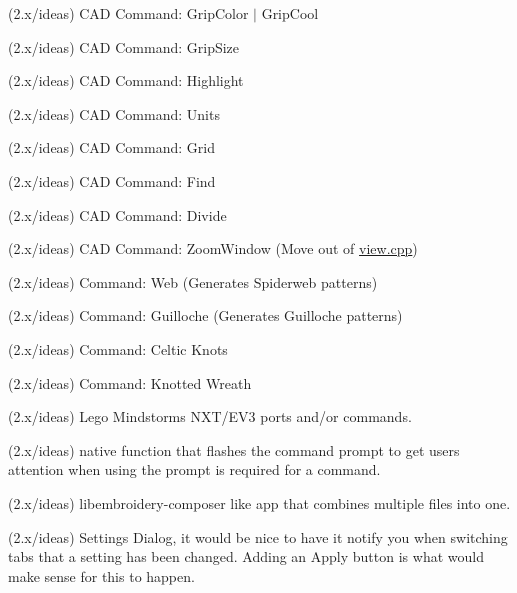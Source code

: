 \begin{DoxyRefList}
\label{todo__todo000089}%
%
(2.\+x/ideas) CAD Command\+: Grip\+Color $|$ Grip\+Cool

\label{todo__todo000090}%
%
(2.\+x/ideas) CAD Command\+: Grip\+Size

\label{todo__todo000091}%
%
(2.\+x/ideas) CAD Command\+: Highlight

\label{todo__todo000092}%
%
(2.\+x/ideas) CAD Command\+: Units

\label{todo__todo000093}%
%
(2.\+x/ideas) CAD Command\+: Grid

\label{todo__todo000094}%
%
(2.\+x/ideas) CAD Command\+: Find

\label{todo__todo000095}%
%
(2.\+x/ideas) CAD Command\+: Divide

\label{todo__todo000096}%
%
(2.\+x/ideas) CAD Command\+: Zoom\+Window (Move out of \mbox{\hyperlink{view_8cpp}{view.\+cpp}})

\label{todo__todo000097}%
%
(2.\+x/ideas) Command\+: Web (Generates Spiderweb patterns)

\label{todo__todo000098}%
%
(2.\+x/ideas) Command\+: Guilloche (Generates Guilloche patterns)

\label{todo__todo000099}%
%
(2.\+x/ideas) Command\+: Celtic Knots

\label{todo__todo000100}%
%
(2.\+x/ideas) Command\+: Knotted Wreath

\label{todo__todo000101}%
%
(2.\+x/ideas) Lego Mindstorms NXT/\+EV3 ports and/or commands.

\label{todo__todo000102}%
%
(2.\+x/ideas) native function that flashes the command prompt to get users attention when using the prompt is required for a command.

\label{todo__todo000103}%
%
(2.\+x/ideas) libembroidery-\/composer like app that combines multiple files into one.

\label{todo__todo000104}%
%
(2.\+x/ideas) Settings Dialog, it would be nice to have it notify you when switching tabs that a setting has been changed. Adding an Apply button is what would make sense for this to happen. 


\end{DoxyRefList}
